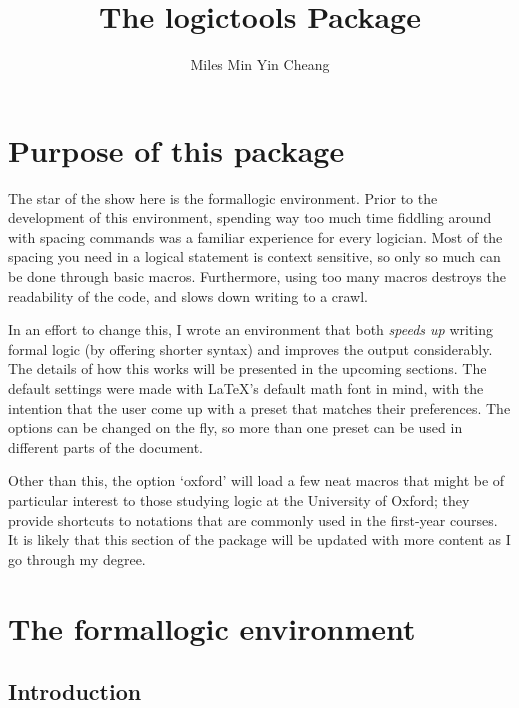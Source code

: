 \documentclass{article}
\title{The logictools Package}
\author{Miles Min Yin Cheang}
\begin{document}
\maketitle
{}
\tableofcontents
\newpage

\section{Purpose of this package}
The star of the show here is the formallogic environment. Prior to the development of this environment, spending way too much time fiddling around with spacing commands was a familiar experience for every logician. Most of the spacing you need in a logical statement is context sensitive, so only so much can be done through basic macros. Furthermore, using too many macros destroys the readability of the code, and slows down writing to a crawl.

In an effort to change this, I wrote an environment that both \emph{speeds up} writing formal logic (by offering shorter syntax) and improves the output considerably. The details of how this works will be presented in the upcoming sections. The default settings were made with \LaTeX's default math font in mind, with the intention that the user come up with a preset that matches their preferences. The options can be changed on the fly, so more than one preset can be used in different parts of the document.

Other than this, the option `oxford' will load a few neat macros that might be of particular interest to those studying logic at the University of Oxford; they provide shortcuts to notations that are commonly used in the first-year courses. It is likely that this section of the package will be updated with more content as I go through my degree.
\newpage
\section{The formallogic environment}
\subsection{Introduction}
\end{document}
